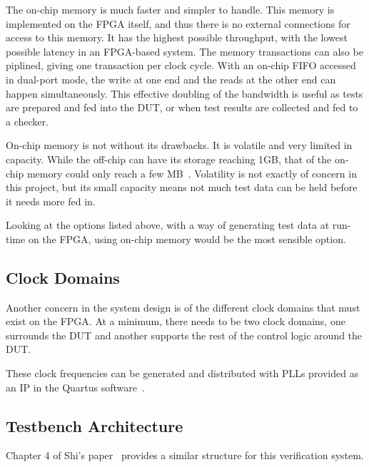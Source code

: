 The on-chip memory is much faster and simpler to handle.
This memory is implemented on the FPGA itself, and thus there is no external
connections for access to this memory.
It has the highest possible throughput, with the lowest possible latency
in an FPGA-based system.
The memory transactions can also be piplined, giving one transaction per
clock cycle.
With an on-chip FIFO accessed in dual-port mode, the write at one end and the
reads at the other end can happen simultaneously.
This effective doubling of the bandwidth is useful as tests are prepared
and fed into the DUT, or when test results are collected and fed to a checker.

On-chip memory is not without its drawbacks.
It is volatile and very limited in capacity.
While the off-chip can have its storage reaching 1GB, that of the on-chip
memory could only reach a few MB~\cite{Altera2}.
Volatility is not exactly of concern in this project, but its small capacity
means not much test data can be held before it needs more fed in.

Looking at the options listed above, with a way of generating test data at
run-time on the FPGA, using on-chip memory would be the most sensible option.


\subsection{Clock Domains}
Another concern in the system design is of the different clock domains that
must exist on the FPGA.
At a minimum, there needs to be two clock domains, one surrounds the DUT and
another supports the rest of the control logic around the DUT.

These clock frequencies can be generated and distributed with PLLs provided as
an IP in the Quartus software~\cite{Altera4}.

\subsection{Testbench Architecture}


Chapter 4 of Shi's paper~\cite{Shi1} provides a similar structure for this
verification system.